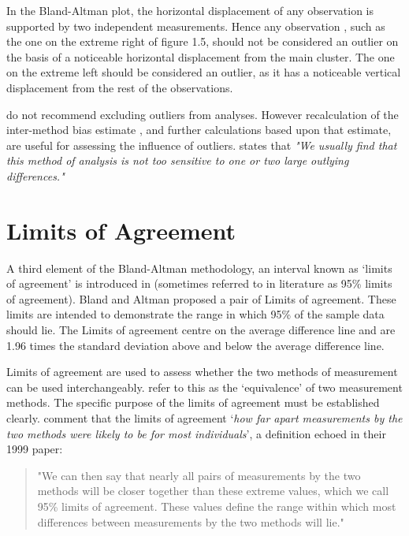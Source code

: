 \documentclass[12pt, a4paper]{report}
\theoremstyle{plain}
\theoremstyle{definition}
\theoremstyle{remark}
\begin{document}
	In the Bland-Altman plot, the horizontal displacement of any
	observation is supported by two independent measurements. Hence
	any observation , such as the one on the extreme right of figure
	1.5, should not be considered an outlier on the basis of a
	noticeable horizontal displacement from the main cluster. The one
	on the extreme left should be considered an outlier, as it has a
	noticeable vertical displacement from the rest of the
	observations.
	
	\citet*{BA99} do not recommend excluding outliers from analyses.
	However recalculation of the inter-method bias estimate , and
	further calculations based upon that estimate, are useful for
	assessing the influence of outliers.\citep{BA99} states that
	\emph{"We usually find that this method of analysis is not too
		sensitive to one or two large outlying differences."}



\section{Limits of Agreement}

A third element of the Bland-Altman methodology, an interval known
as `limits of agreement' is introduced in \citet*{BA86}
(sometimes referred to in literature as 95\% limits of agreement). Bland and Altman proposed a pair of Limits of agreement. These
limits are intended to demonstrate the range in which 95\% of the
sample data should lie. The Limits of agreement centre on the
average difference line and are 1.96 times the standard deviation
above and below the average difference line.

Limits of agreement are used to assess whether the two methods of
measurement can be used interchangeably. \citet{BA86} refer to
this as the `equivalence' of two measurement methods. The specific purpose of the limits of
agreement must be
established clearly. \citet*{BA95} comment that the limits of agreement `\textit{how
	far apart measurements by the two methods were likely to be for
	most individuals}', a definition echoed in their 1999 paper:

\begin{quote}"We can then say that nearly all pairs
	of measurements by the two methods will be closer together than
	these extreme values, which we call 95\% limits of agreement.
	These values define the range within which most differences
	between measurements by the two methods will lie."
\end{quote}
\end{document}
